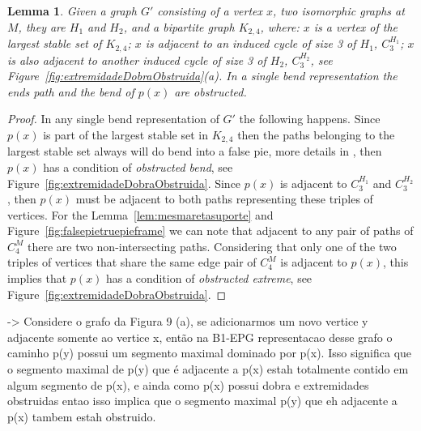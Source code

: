 \documentclass[a4paper,11pt]{article}
\newtheorem{lema}[theorem]{Lemma}
\begin{document}
%


%



\begin{lema}\label{lem:obstrucao}
Given a graph $ G'$ consisting of a vertex $ x $, two isomorphic graphs at $ M $, they are $ H_1 $ and $ H_2 $, and a bipartite graph $ K_{2,4}$, where: $ x $ is a vertex of the largest stable set of $ K_{2,4} $; $x $ is adjacent to an induced cycle of size 3 of $ H_1 $, $ C_3^{H_1} $; $x $ is also adjacent to another induced cycle of size 3 of $ H_2 $, $ C_3^{H_2}$, see Figure~\ref{fig:extremidadeDobraObstruida}(a). In a single bend representation the ends path and the bend of $p(x) $ are obstructed.%
\end{lema}

\begin{proof}
In any single bend representation of $ G'$ the following happens. Since $ p(x) $ is part of the largest stable set in $ K_{2,4} $ then the paths belonging to the largest stable set always will do bend into a false pie, more details in \citep{Asinowski2009}, then $ p(x) $ has a condition of \emph {obstructed bend}, see Figure~\ref{fig:extremidadeDobraObstruida}. Since $ p(x) $ is adjacent to $ C_{3}^{H_1}$ and $ C_3^{H_2}$, then $ p(x) $ must be adjacent to both paths representing these triples of vertices. For the Lemma~\ref{lem:mesmaretasuporte} and Figure~\ref{fig:falsepietruepieframe} we can note that adjacent to any pair of paths of $ C_4^M $ there are two non-intersecting paths. Considering that only one of the two triples of vertices that share the same edge pair of $ C_4^M $ is adjacent to $ p(x) $, this implies that $ p(x) $ has a condition of \emph{obstructed extreme}, see Figure~\ref{fig:extremidadeDobraObstruida}.
\end{proof}



-> Considere o grafo da Figura 9 (a), se adicionarmos um novo vertice y adjacente somente ao vertice x, então na B1-EPG representacao desse grafo o caminho p(y) possui um segmento maximal dominado por p(x). Isso significa que o segmento maximal de p(y) que é adjacente a p(x) estah totalmente contido em algum segmento de p(x), e ainda como p(x) possui dobra e extremidades obstruidas entao isso implica que o segmento maximal p(y) que eh adjacente a p(x) tambem estah obstruido.
\end{document}
